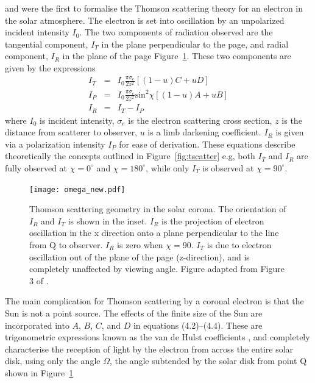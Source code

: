 \citet{schuster1879} and \citet{minnaert1930} were the first to formalise the Thomson scattering theory for an electron in the solar atmosphere. The electron is set into oscillation by an unpolarized  incident intensity $I_0$.
The two components of radiation observed are the tangential component, $I_T$ in the plane perpendicular to the page, and radial component, $I_R$ in the plane of the page Figure~\ref{fig:omega}. 
These two components are given by the expressions \citep{howtap2009}
\begin{eqnarray}
I_T &=& I_0\frac{\pi \sigma_e}{2z^2}[(1-u)C +uD] \\
I_P &=& I_0\frac{\pi \sigma_e}{2z^2}\mathrm{sin}^2\chi[(1-u)A +uB] \\
I_R &=& I_T-I_P
\end{eqnarray}
where $I_0$ is incident intensity, $\sigma_e$ is the electron scattering cross section, $z$ is the distance from scatterer to observer, $u$ is a limb darkening coefficient. $I_R$ is given via a polarization intensity $I_P$ for ease of derivation. These equations describe theoretically the concepts outlined in Figure~\ref{fig:tscatter} e.g, both $I_T$ and $I_R$ are fully observed at $\chi=0^{\circ}$ and $\chi=180^{\circ}$, while only $I_T$ is observed at $\chi=90^{\circ}$. 
\begin{figure}[!t]
\begin{center}
\texttt{[image: omega\_new.pdf]}
\caption[Thomson scattering geometry in the solar corona]{Thomson scattering geometry in the solar corona. The orientation of $I_R$ and $I_T$ is shown in the inset. $I_R$ is the projection of electron oscillation in the x direction onto a plane perpendicular to the line from Q to observer. $I_R$ is zero when $\chi=90$. $I_T$ is due to electron oscillation out of the plane of the page (z-direction), and is completely unaffected by viewing angle. Figure adapted from Figure 3 of \citep{howtap2009}.}
\label{fig:omega}
\end{center}
\end{figure}
The main complication for Thomson scattering by a coronal electron is that the Sun is not a point source. The effects of the finite size of the Sun are incorporated into $A$, $B$, $C$, and $D$ in equations (4.2)--(4.4). These are trigonometric expressions known as the van de Hulst coefficients \citet{vdeh50}, and completely characterise the reception of light by the electron from across the entire solar disk, using only the angle $\Omega$, the angle subtended by the solar disk from point Q shown in Figure~\ref{fig:omega} \citep{minnaert1930, billings1966, billings1966} 
